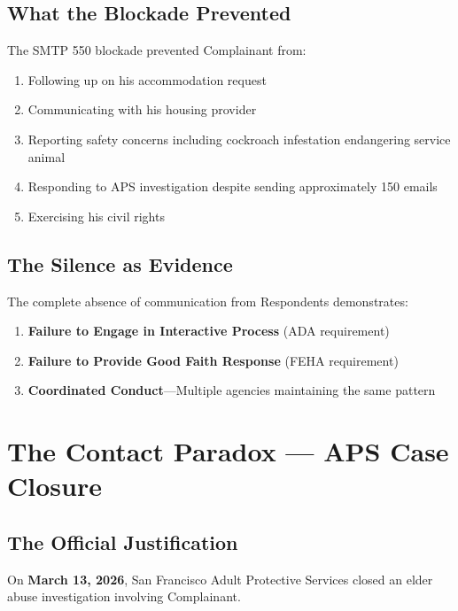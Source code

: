 \documentclass[12pt,letterpaper]{article}
\begin{document}
\subsection{What the Blockade Prevented}

The SMTP 550 blockade prevented Complainant from:
\begin{enumerate}[noitemsep]
    \item Following up on his accommodation request
    \item Communicating with his housing provider
    \item Reporting safety concerns including cockroach infestation endangering service animal
    \item Responding to APS investigation despite sending approximately 150 emails
    \item Exercising his civil rights
\end{enumerate}

\subsection{The Silence as Evidence}

The complete absence of communication from Respondents demonstrates:
\begin{enumerate}[noitemsep]
    \item \textbf{Failure to Engage in Interactive Process} (ADA requirement)
    \item \textbf{Failure to Provide Good Faith Response} (FEHA requirement)
    \item \textbf{Coordinated Conduct}---Multiple agencies maintaining the same pattern
\end{enumerate}

\newpage

\section{The Contact Paradox --- APS Case Closure}

\subsection{The Official Justification}

On \textbf{March 13, 2026}, San Francisco Adult Protective Services closed an elder abuse investigation involving Complainant.
\end{document}
